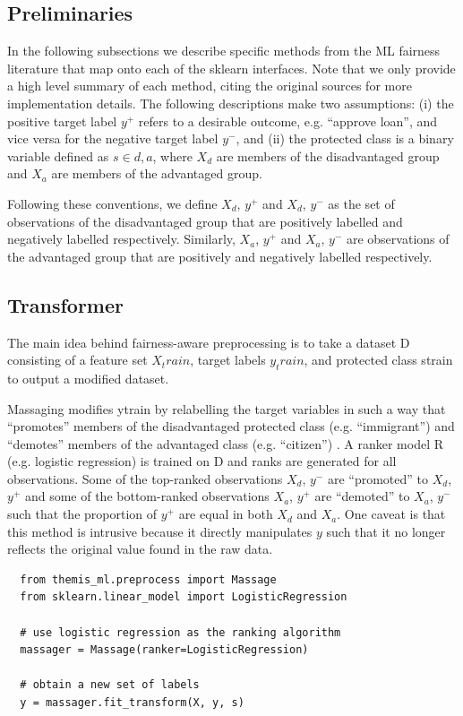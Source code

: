 \documentclass{acm_proc_article-sp}
\begin{document}
\subsection{Preliminaries} In the following subsections we describe specific
methods from the ML fairness literature that map onto each of the sklearn
interfaces. Note that we only provide a high level summary of each method,
citing the original sources for more implementation details. The following
descriptions make two assumptions: (i) the positive target label \(y^{+}\)
refers to a desirable outcome, e.g. ``approve loan'', and vice versa for the
negative target label \(y^{-}\), and (ii) the protected class is a binary
variable defined as \(s \in {d, a}\), where \(X_d\)  are members of the
disadvantaged group and \(X_a\) are members of the advantaged group.

Following these conventions, we define \(X_d\), \(y^{+}\) and \(X_d\), \(y^{-}\)
as the set of observations of the disadvantaged group that are positively
labelled and negatively labelled respectively. Similarly, \(X_a\), \(y^{+}\) and
\(X_a\), \(y^{-}\)  are observations of the advantaged group that are positively
and negatively labelled respectively.

\subsection{Transformer} The main idea behind fairness-aware preprocessing is to
take a dataset D consisting of a feature set \(X_train\), target labels
\(y_train\), and protected class strain to output a modified dataset.

Massaging modifies ytrain by relabelling the target variables in such a way that
``promotes'' members of the disadvantaged protected class (e.g. ``immigrant'')
and ``demotes'' members of the advantaged class (e.g. ``citizen'')
\cite{kamiran2012data}. A ranker model R (e.g. logistic regression) is trained
on D and ranks are generated for all observations. Some of the top-ranked
observations \(X_d\), \(y^{-}\)  are ``promoted'' to \(X_d\), \(y^{+}\) and some
of the bottom-ranked observations \(X_a\), \(y^{+}\)  are ``demoted'' to
\(X_a\), \(y^{-}\) such that the proportion of \(y^{+}\) are equal in both
\(X_d\) and \(X_a\). One caveat is that this method is intrusive because it
directly manipulates \(y\) such that it no longer reflects the original value
found in the raw data.

\begin{verbatim}
  from themis_ml.preprocess import Massage
  from sklearn.linear_model import LogisticRegression

  # use logistic regression as the ranking algorithm
  massager = Massage(ranker=LogisticRegression)

  # obtain a new set of labels
  y = massager.fit_transform(X, y, s)
\end{verbatim}
\end{document}
